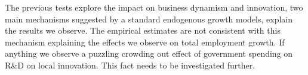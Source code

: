 \documentclass[dv_diss_main.tex]{subfiles}
\begin{document}
The previous tests explore the impact on business dynamism and innovation, two main mechanisms suggested by a standard endogenous growth models, explain the results we observe. The empirical estimates are not consistent with this mechanism explaining the effects we observe on total employment growth. If anything we observe a puzzling crowding out effect of government spending on R\&D on local innovation. This fact needs to be investigated further. 

\iffalse
\begin{comment}
\subsection{Marginal Propensity to Consume}
\label{subsec:mpc}

Government spending is not equally distributed across the US. Figure \ref{fig:map_spend} also emphasizes that the distribution of government spending among locations varies by type of spending. Locality-specific characteristics might matter in the transmission of a fiscal shock to the economy. One potential explanation for the heterogeneous fiscal multipliers by category of spending is marginal propensities to consume (MPCs) are different across locations. Specifically, if spending in physical goods were directed to locations with lower MPCs, then one could observe a low or even zero fiscal multiplier.

To test this mechanism, we compute the MPCs at state-level using the Panel Study of Income Dynamics (PSID) from $1999$ to $2019$. Our estimation is based on the PSID Core Sample after applying a few restrictions. First, we remove households with missing information on race, education, or state of residence. We also drop households that experience income growth greater than $500\%$ or drops greater than $80\%$. We discard households with income below $100$ USD and with top-coded income or consumption. To estimate the MPCs we need a minimum of three periods, thus we drop households that appear fewer than three consecutive times. We restrict the sample to households with the head between 25 and 55 years old. We follow \cite{Blundell2014} in constructing the consumption measure. Our consumption measure accounts for food at home and food away from home, food stamps, utilities, gasoline, car maintenance, public transportation, childcare, health expenditures, and education. Our definition of household income the labor earnings of a household after-taxes plus government transfers.


\end{comment}
\end{document}
